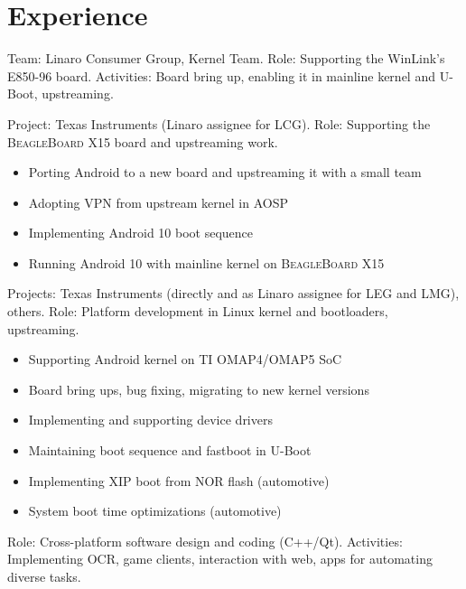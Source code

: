 \documentclass[11pt,letterpaper,sans]{moderncv}
\begin{document}
\section{Experience}
  {Team: Linaro Consumer Group, Kernel Team. \newline{}
   Role: Supporting the WinLink’s \textsc{E850-96} board. \newline{}
   Activities: Board bring up, enabling it in mainline kernel and U-Boot,
   upstreaming.}
  {Project: Texas Instruments (Linaro assignee for LCG). \newline{}
   Role: Supporting the \textsc{BeagleBoard X15} board and upstreaming work.
   \begin{itemize}
     \item Porting Android to a new board and upstreaming it with a small team
     \item Adopting VPN from upstream kernel in AOSP
     \item Implementing Android 10 boot sequence
     \item Running Android 10 with mainline kernel on \textsc{BeagleBoard X15}
   \end{itemize}}
  {Projects: Texas Instruments (directly and as Linaro assignee for LEG and
   LMG), others. \newline{}
   Role: Platform development in Linux kernel and bootloaders, upstreaming.
   \begin{itemize}
     \item Supporting Android kernel on TI OMAP4/OMAP5 SoC
     \item Board bring ups, bug fixing, migrating to new kernel versions
     \item Implementing and supporting device drivers
     \item Maintaining boot sequence and fastboot in U-Boot
     \item Implementing XIP boot from NOR flash (automotive)
     \item System boot time optimizations (automotive)
   \end{itemize}
  }
  {Role: Cross-platform software design and coding (C++/Qt). \newline{}
   Activities: Implementing OCR, game clients, interaction with web, apps for
   automating diverse tasks.}
\end{document}
